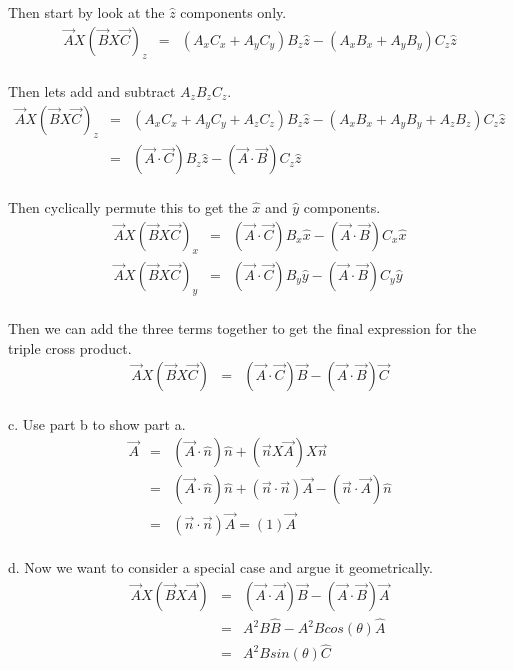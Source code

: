 \documentclass[11pt]{amsart}
\begin{document}
Then start by look at the $\hat{z}$ components only. \\
\begin{eqnarray*}
\vec{A}X(\vec{B}X\vec{C})_{z} &=& (A_{x}C_{x}+A_{y}C_{y})B_{z}\hat{z}-(A_{x}B_{x}+A_{y}B_{y})C_{z}\hat{z} 
\end{eqnarray*} \\
Then lets add and subtract $A_{z}B_{z}C_{z}$. \\
\begin{eqnarray*}
\vec{A}X(\vec{B}X\vec{C})_{z} &=& (A_{x}C_{x}+A_{y}C_{y}+A_{z}C_{z})B_{z}\hat{z}-(A_{x}B_{x}+A_{y}B_{y}+A_{z}B_{z})C_{z}\hat{z} \\
&=& (\vec{A}\cdot{\vec{C}})B_{z}\hat{z}-(\vec{A}\cdot{\vec{B}})C_{z}\hat{z}
\end{eqnarray*} \\
Then cyclically permute this to get the $\hat{x}$ and $\hat{y}$ components. \\
\begin{eqnarray*} 
\vec{A}X(\vec{B}X\vec{C})_{x} &=& (\vec{A}\cdot{\vec{C}})B_{x}\hat{x}-(\vec{A}\cdot{\vec{B}})C_{x}\hat{x} \\
\vec{A}X(\vec{B}X\vec{C})_{y} &=& (\vec{A}\cdot{\vec{C}})B_{y}\hat{y}-(\vec{A}\cdot{\vec{B}})C_{y}\hat{y} 
\end{eqnarray*} \\
Then we can add the three terms together to get the final expression for the triple cross product. \\
\begin{eqnarray*}
\vec{A}X(\vec{B}X\vec{C}) &=& (\vec{A}\cdot{\vec{C}})\vec{B}-(\vec{A}\cdot{\vec{B}})\vec{C} 
\end{eqnarray*} \\
c. Use part b to show part a. \\
\begin{eqnarray*}
\vec{A} &=& (\vec{A}\cdot{\hat{n}})\hat{n}+(\vec{n}X\vec{A})X\vec{n} \\
&=& (\vec{A}\cdot{\hat{n}})\hat{n}+(\vec{n}\cdot{\vec{n}})\vec{A}-(\vec{n}\cdot{\vec{A}})\hat{n} \\
&=& (\vec{n}\cdot{\vec{n}})\vec{A} = (1)\vec{A} \
\end{eqnarray*} \\
d. Now we want to consider a special case and argue it geometrically. \\
\begin{eqnarray*}
\vec{A}X(\vec{B}X\vec{A}) &=& (\vec{A}\cdot{\vec{A}})\vec{B}-(\vec{A}\cdot{\vec{B}})\vec{A} \\
&=& A^{2}B\hat{B}-A^{2}Bcos(\theta)\hat{A} \\
&=& A^{2}Bsin(\theta)\hat{C}  
\end{eqnarray*} \\
\end{document}
